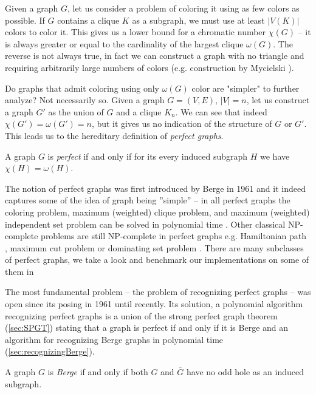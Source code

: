 Given a graph $G$, let us consider a problem of coloring it using as few colors as possible. If $G$ contains a clique $K$ as a subgraph, we must use at least $|V(K)|$ colors to color it. This gives us a lower bound for a chromatic number $\chi(G)$ -- it is always greater or equal to the cardinality of the largest clique $\omega(G)$. The reverse is not always true, in fact we can construct a graph with no triangle and requiring arbitrarily large numbers of colors (e.g. construction by Mycielski \cite{Mycielski1955}).

Do graphs that admit coloring using only $\omega(G)$ color are "simpler" to further analyze? Not necessarily so. Given a graph $G = (V, E)$, $|V| = n$, let us construct a graph $G'$ as the union of $G$ and a clique $K_n$. We can see that indeed $\chi(G') = \omega(G') = n$, but it gives us no indication of the structure of $G$ or $G'$. This leads us to the hereditary definition of \emph{perfect graphs}.

\begin{defn}
	\label{def:perfectGraph}
	A graph $G$ is \emph{perfect} if and only if for its every induced subgraph $H$ we have $\chi(H) = \omega(H)$.
\end{defn}

The notion of perfect graphs was first introduced by Berge in 1961 \cite{CB61} and it indeed captures some of the idea of graph being ''simple'' -- in all perfect graphs the coloring problem, maximum (weighted) clique problem, and maximum (weighted) independent set problem can be solved in polynomial time \cite{grotschel1993}. Other classical NP-complete problems are still NP-complete in perfect graphs e.g. Hamiltonian path \cite{Mller1996}, maximum cut problem \cite{Bodlaender1994} or dominating set problem \cite{Dewdney81}. There are many subclasses of perfect graphs, we take a look and benchmark our implementations on some of them in 

The most fundamental problem -- the problem of recognizing perfect graphs -- was open since its posing in 1961 until recently. Its solution, a polynomial algorithm recognizing perfect graphs is a union of the strong perfect graph theorem (\cref{sec:SPGT}) stating that a graph is perfect if and only if it is Berge and an algorithm for recognizing Berge graphs in polynomial time (\cref{sec:recognizingBerge}).

\begin{defn}
	\label{def:bergeGraph}
	A graph $G$ is \emph{Berge} if and only if both $G$ and $\overline{G}$ have no odd hole as an induced subgraph.
\end{defn}

